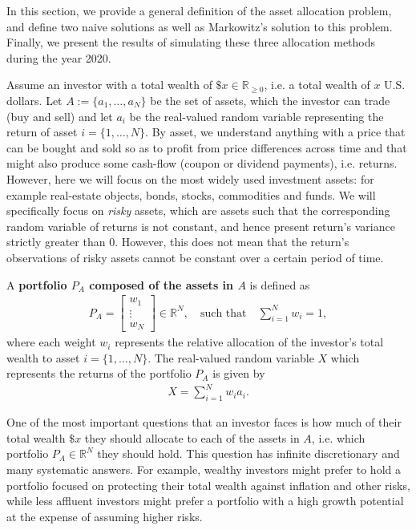 
In this section, we provide a general definition of the asset allocation problem, and define two naive solutions as well as Markowitz's solution to this problem. Finally, we present the results of simulating these three allocation methods during the year 2020.

Assume an investor with a total wealth of $\$x \in \mathbb{R}_{\geq 0}$, i.e. a total wealth of $x$ U.S. dollars. Let $A := \{a_1, \dots, a_N \}$ be the set of assets, which the investor can trade (buy and sell) and let $a_i$ be the real-valued random variable representing the return of asset $i = \{ 1, \dots, N \}$. By asset, we understand anything with a price that can be bought and sold so as to profit from price differences across time and that might also produce some cash-flow (coupon or dividend payments), i.e. returns. However, here we will focus on the most widely used investment assets: for example real-estate objects, bonds, stocks, commodities and funds. We will specifically focus on \textit{risky} assets, which are assets such that the corresponding random variable of returns is not constant, and hence present return's variance strictly greater than $0$. However, this does not mean that the return's observations of risky assets cannot be constant over a certain period of time.

\begin{definition}
    A \textbf{portfolio $P_A$ composed of the assets in $A$} is defined as
    \begin{align*}
        P_A = \begin{bmatrix} w_1 \\ \vdots \\ w_N \end{bmatrix} \in \mathbb{R}^N, \quad \text{such that} \quad \sum_{i=1}^N w_i = 1,
    \end{align*}
    where each weight $w_i$ represents the relative allocation of the investor's total wealth to asset $i = \{ 1, \dots, N \}$. The real-valued random variable $X$ which represents the returns of the portfolio $P_A$ is given by
    \begin{align*}
        X = \sum_{i=1}^N w_i a_i.
    \end{align*}
\end{definition}

One of the most important questions that an investor faces is how much of their total wealth $\$x$ they should allocate to each of the assets in $A$, i.e. which portfolio $P_A \in \mathbb{R}^N$ they should hold. This question has infinite discretionary and many systematic answers. For example, wealthy investors might prefer to hold a portfolio focused on protecting their total wealth against inflation and other risks, while less affluent investors might prefer a portfolio with a high growth potential at the expense of assuming higher risks.


